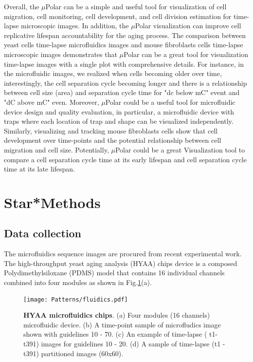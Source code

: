 \documentclass[conference]{IEEEtran}
\begin{document}
Overall, the $\mu$Polar can be a simple and useful tool for visualization of cell migration, cell monitoring, cell development, and cell division estimation for time-lapse microscopic images. In addition, the $\mu$Polar visualization can improve cell replicative lifespan accountability for the aging process. The comparison between yeast cells time-lapse microfluidics images and mouse fibroblasts cells time-lapse microscopic images demonstrates that $\mu$Polar can be a great tool for visualization time-lapse images with a single plot
with comprehensive details. For instance, in the microfluidic images, we realized when cells becoming older over time, interestingly, the cell separation cycle becoming longer and there is a relationship between cell size (area) and separation cycle time for "dc below mC" event and "dC above mC" even. Moreover, $\mu$Polar could be a useful tool for microfluidic device design and quality evaluation, in particular, a microfluidic device with traps where each location of trap and shape can be visualized independently. Similarly, visualizing and tracking mouse fibroblasts cells show that cell development over time-points and the potential relationship between cell migration and cell size. Potentially, $\mu$Polar could be a great Visualization tool to compare a cell separation cycle time at its early lifespan and cell separation cycle time at its late lifespan.

  

\section{Star*Methods}

\subsection*{Data collection}
The microfluidics sequence images are procured from \cite{ref13} recent experimental work. The high-throughput yeast aging analysis (HYAA) chips device is a composed Polydimethylsiloxane (PDMS) model that contains 16 individual channels combined into four modules as shown in Fig.\ref{fig:micro}(a).

\begin{figure}
\centering
\texttt{[image: Patterns/fluidics.pdf]}
\caption{ \textbf{HYAA microfluidics chips}. (a) Four modules (16 channels) microfluidic device. (b) A time-point sample of microfludics image shown with guidelines 10 - 70. (c) An example of time-lapse ( t1-t391) images for guidelines 10 - 20. (d) A sample of time-lapse (t1 - t391) partitioned images (60x60).}
\label{fig:micro}
\end{figure}
\end{document}
